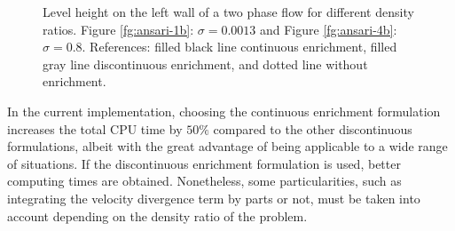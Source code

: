   \begin{figure}[h]
  \centering
   \caption{Level height on the left wall of a two phase flow for different density ratios. Figure \ref{fg:ansari-1b}: $\sigma=0.0013$ and Figure \ref{fg:ansari-4b}: $\sigma=0.8$. References: filled black line continuous enrichment, filled gray line discontinuous enrichment, and dotted line without enrichment.}
   \label{fg:ansari-results-b}                %
\end{figure}

In the current implementation, choosing the continuous enrichment formulation increases the total CPU time by $50\%$ compared to the other discontinuous formulations, albeit with the great advantage of being applicable to a wide range of situations. If the discontinuous enrichment formulation is used, better computing times are obtained. Nonetheless, some particularities, such as integrating the velocity divergence term by parts or not, must be taken into account depending on the density ratio of the problem.

\clearpage
